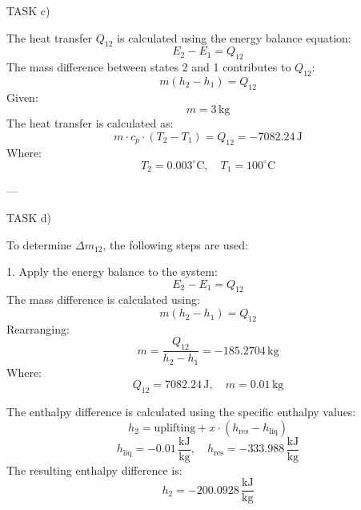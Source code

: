 TASK c)

The heat transfer \( Q_{12} \) is calculated using the energy balance equation:
\[
E_2 - E_1 = Q_{12}
\]
The mass difference between states 2 and 1 contributes to \( Q_{12} \):
\[
m(h_2 - h_1) = Q_{12}
\]
Given:
\[
m = 3 \, \text{kg}
\]
The heat transfer is calculated as:
\[
m \cdot c_p \cdot (T_2 - T_1) = Q_{12} = -7082.24 \, \text{J}
\]
Where:
\[
T_2 = 0.003^\circ\text{C}, \quad T_1 = 100^\circ\text{C}
\]

---

TASK d)

To determine \( \Delta m_{12} \), the following steps are used:

1. Apply the energy balance to the system:
\[
E_2 - E_1 = Q_{12}
\]
The mass difference is calculated using:
\[
m(h_2 - h_1) = Q_{12}
\]
Rearranging:
\[
m = \frac{Q_{12}}{h_2 - h_1} = -185.2704 \, \text{kg}
\]
Where:
\[
Q_{12} = 7082.24 \, \text{J}, \quad m = 0.01 \, \text{kg}
\]

The enthalpy difference is calculated using the specific enthalpy values:
\[
h_2 = \text{uplifting} + x \cdot (h_{\text{res}} - h_{\text{liq}})
\]
\[
h_{\text{liq}} = -0.01 \, \frac{\text{kJ}}{\text{kg}}, \quad h_{\text{res}} = -333.988 \, \frac{\text{kJ}}{\text{kg}}
\]
The resulting enthalpy difference is:
\[
h_2 = -200.0928 \, \frac{\text{kJ}}{\text{kg}}
\]